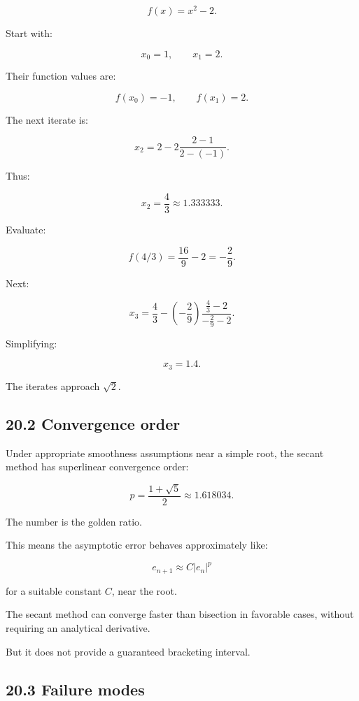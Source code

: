 \[ f(x)=x^2-2. \]

Start with:

\[ x_0=1,\qquad x_1=2. \]

Their function values are:

\[ f(x_0)=-1,\qquad f(x_1)=2. \]

The next iterate is:

\[ x_2= 2- 2\frac{2-1}{2-(-1)}. \]

Thus:

\[ \boxed{x_2=\frac43\approx1.333333}. \]

Evaluate:

\[ f(4/3)=\frac{16}{9}-2=-\frac29. \]

Next:

\[ x_3= \frac43- \left(-\frac29\right) \frac{\frac43-2}{-\frac29-2}. \]

Simplifying:

\[ \boxed{x_3=1.4}. \]

The iterates approach \(\sqrt2\).

\subsection{20.2 Convergence order}\label{02-foundations-ii-ch028-convergence-order}

\hypertarget{02-foundations-ii-ch028-convergence-order}{}

Under appropriate smoothness assumptions near a simple root, the secant method has superlinear convergence order:

\[ \boxed{ p=\frac{1+\sqrt5}{2}\approx1.618034 }. \]

The number is the golden ratio.

This means the asymptotic error behaves approximately like:

\[ e_{n+1}\approx C|e_n|^p \]

for a suitable constant \(C\), near the root.

The secant method can converge faster than bisection in favorable cases, without requiring an analytical derivative.

But it does not provide a guaranteed bracketing interval.

\subsection{20.3 Failure modes}\label{02-foundations-ii-ch028-failure-modes}

\hypertarget{02-foundations-ii-ch028-failure-modes}{}

